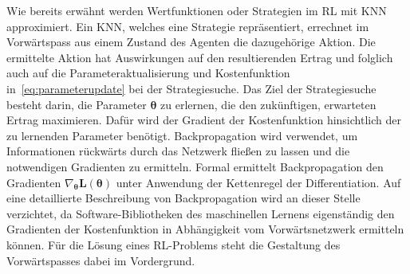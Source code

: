 Wie bereits erwähnt werden Wertfunktionen oder Strategien im RL mit KNN approximiert. 
Ein KNN, welches eine Strategie repräsentiert, errechnet im Vorwärtspass aus einem Zustand des Agenten die dazugehörige Aktion. Die ermittelte Aktion hat Auswirkungen auf den resultierenden Ertrag und folglich auch auf die Parameteraktualisierung und Kostenfunktion in~\eqref{eq:parameterupdate} bei der Strategiesuche. Das Ziel der Strategiesuche besteht darin, die Parameter $\bm{\theta}$ zu erlernen, die den zukünftigen, erwarteten Ertrag maximieren. Dafür wird der Gradient der Kostenfunktion hinsichtlich der zu lernenden Parameter benötigt. 
Backpropagation wird verwendet, um Informationen rückwärts durch das Netzwerk fließen zu lassen und die notwendigen Gradienten zu ermitteln. 
Formal ermittelt Backpropagation den Gradienten $\nabla_{\bm{\theta}} \bm{L}(\bm{\theta})$ unter Anwendung der Kettenregel der Differentiation. Auf eine detaillierte Beschreibung von Backpropagation wird an dieser Stelle verzichtet, da Software-Bibliotheken des maschinellen Lernens eigenständig den Gradienten der Kostenfunktion in Abhängigkeit vom Vorwärtsnetzwerk ermitteln können. Für die Lösung eines RL-Problems steht die Gestaltung des Vorwärtspasses dabei im Vordergrund. \newline
